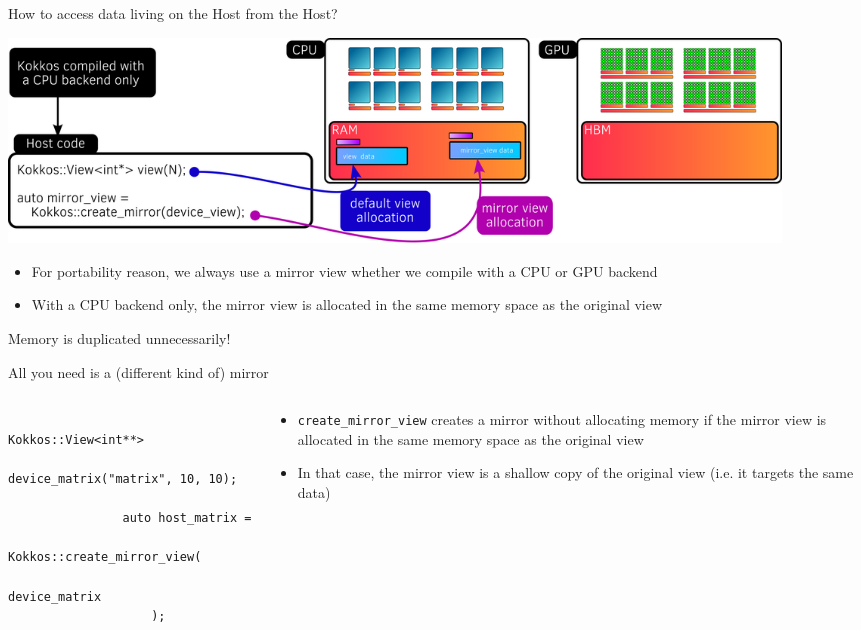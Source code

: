 \documentclass[
    aspectratio=169,
    handout,
]{beamer}
\begin{document}

\begin{frame}{How to access data living on the Host from the Host?}
    \begin{center}
        \includegraphics[width=0.9\textwidth]{host_mirror_view.png}
    \end{center}
    \begin{itemize}
        \item For portability reason, we always use a mirror view whether we compile with a CPU or GPU backend
        \item With a CPU backend only, the mirror view is allocated in the same memory space as the original view
    \end{itemize}

     Memory is duplicated unnecessarily!
\end{frame}


\begin{frame}[fragile]{All you need is a (different kind of) mirror}
    \begin{columns}
        \begin{column}{0.525\linewidth}
            \begin{verbatim}
                Kokkos::View<int**>
                    device_matrix("matrix", 10, 10);

                auto host_matrix =
                    Kokkos::create_mirror_view(
                        device_matrix
                    );
            \end{verbatim}
        \end{column}
        \begin{column}{0.475\linewidth}
            \begin{itemize}
                \item \texttt{create\_mirror\_view} creates a mirror without allocating memory if the mirror view is allocated in the same memory space as the original view
                \item In that case, the mirror view is a shallow copy of the original view (i.e. it targets the same data)
            \end{itemize}
        \end{column}
    \end{columns}
\end{frame}
\end{document}
